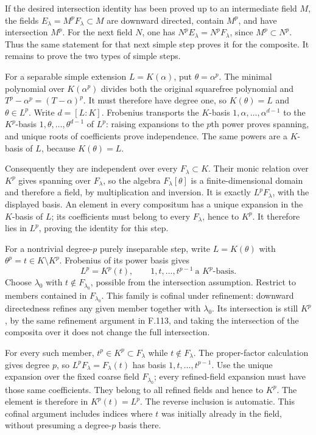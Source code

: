 \documentclass[11pt,a4paper,openany]{report}
\begin{document}
If the desired intersection identity has been proved up to an intermediate field \(M\), the fields \(E_\lambda=M^pF_\lambda\subset M\) are downward directed, contain \(M^p\), and have intersection \(M^p\). For the next field \(N\), one has \(N^pE_\lambda=N^pF_\lambda\), since \(M^p\subset N^p\). Thus the same statement for that next simple step proves it for the composite. It remains to prove the two types of simple steps.

For a separable simple extension \(L=K(\alpha)\), put \(\theta=\alpha^p\). The minimal polynomial over \(K(\alpha^p)\) divides both the original squarefree polynomial and \(T^p-\alpha^p=(T-\alpha)^p\). It must therefore have degree one, so \(K(\theta)=L\) and \(\theta\in L^p\). Write \(d=[L:K]\). Frobenius transports the \(K\)-basis \(1,\alpha,\ldots,\alpha^{d-1}\) to the \(K^p\)-basis \(1,\theta,\ldots,\theta^{d-1}\) of \(L^p\): raising expansions to the \(p\)th power proves spanning, and unique roots of coefficients prove independence. The same powers are a \(K\)-basis of \(L\), because \(K(\theta)=L\).

Consequently they are independent over every \(F_\lambda\subset K\). Their monic relation over \(K^p\) gives spanning over \(F_\lambda\), so the algebra \(F_\lambda[\theta]\) is a finite-dimensional domain and therefore a field, by multiplication and inversion. It is exactly \(L^pF_\lambda\), with the displayed basis. An element in every compositum has a unique expansion in the \(K\)-basis of \(L\); its coefficients must belong to every \(F_\lambda\), hence to \(K^p\). It therefore lies in \(L^p\), proving the identity for this step.

For a nontrivial degree-\(p\) purely inseparable step, write \(L=K(\theta)\) with \(\theta^p=t\in K\setminus K^p\). Frobenius of its power basis gives \[L^p=K^p(t),\qquad 1,t,\ldots,t^{p-1}\ \text{a }K^p\text{-basis}.\] Choose \(\lambda_0\) with \(t\notin F_{\lambda_0}\), possible from the intersection assumption. Restrict to members contained in \(F_{\lambda_0}\). This family is cofinal under refinement: downward directedness refines any given member together with \(\lambda_0\). Its intersection is still \(K^p\), by the same refinement argument in F.113, and taking the intersection of the composita over it does not change the full intersection.

For every such member, \(t^p\in K^p\subset F_\lambda\) while \(t\notin F_\lambda\). The proper-factor calculation gives degree \(p\), so \(L^pF_\lambda=F_\lambda(t)\) has basis \(1,t,\ldots,t^{p-1}\). Use the unique expansion over the fixed coarse field \(F_{\lambda_0}\); every refined-field expansion must have those same coefficients. They belong to all refined fields and hence to \(K^p\). The element is therefore in \(K^p(t)=L^p\). The reverse inclusion is automatic. This cofinal argument includes indices where \(t\) was initially already in the field, without presuming a degree-\(p\) basis there.
\end{document}
